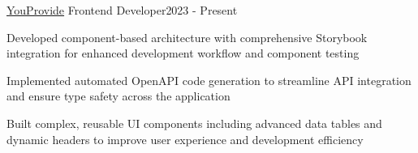 \resumeSubheading
  {\href{https://youprovide.nl/}{YouProvide}}{}
  {Frontend Developer}{2023 - Present}
  \vspace{\experienceItemSpacing}
  \resumeItemListStart
\item Developed component-based architecture with comprehensive Storybook integration for enhanced development workflow and component testing
\item Implemented automated OpenAPI code generation to streamline API integration and ensure type safety across the application
\item Built complex, reusable UI components including advanced data tables and dynamic headers to improve user experience and development efficiency
  \resumeItemListEnd 